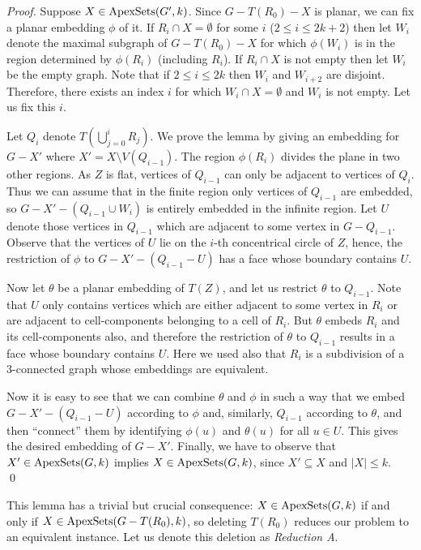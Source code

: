 \documentclass{llncs}
\begin{document}
\begin{proof}
Suppose $X \in \textup{ApexSets}(G',k)$.
Since $G-T(R_0)-X$ is planar, we can fix a planar embedding $\phi$ of it.
If $R_i \cap X = \emptyset$ for some $i$ ($2 \leq i \leq 2k+2$)
then let $W_i$ denote the maximal subgraph of $G-T(R_0)-X$ for
which $\phi(W_i)$ is in the region determined by $\phi(R_i)$ (including $R_i$).
If $R_i \cap X$ is not empty then let $W_i$ be the empty graph.
Note that if $2 \leq i \leq 2k$ then $W_i$ and $W_{i+2}$ are disjoint.
Therefore, there exists an index $i$ for which $W_i \cap X = \emptyset$
and $W_i$ is not empty.
Let us fix this $i$.

Let $Q_i$ denote $T(\bigcup_{j=0}^i R_j)$.
We prove the lemma by giving an embedding for $G-X'$ where
$X'=X \setminus V(Q_{i-1})$.
The region $\phi(R_i)$ divides the plane in two other regions.
As $Z$ is flat, vertices of $Q_{i-1}$ can only be adjacent to vertices of $Q_i$.
Thus we can assume that in the finite region only vertices of $Q_{i-1}$ are embedded, so
$G-X'-(Q_{i-1} \cup W_i)$ is entirely embedded in the infinite region.
Let $U$ denote those vertices in $Q_{i-1}$ which are adjacent
to some vertex in $G-Q_{i-1}$.
Observe that the vertices of $U$ lie on the $i$-th concentrical circle of $Z$, hence,
the restriction of $\phi$ to $G-X'-(Q_{i-1}-U)$ has a face whose boundary contains $U$.


Now let $\theta$ be a planar embedding of $T(Z)$, and let us restrict $\theta$ to $Q_{i-1}$.
Note that $U$ only contains vertices which are either
adjacent to some vertex in $R_i$ or are adjacent to cell-components
belonging to a cell of $R_i$.
But $\theta$ embeds $R_i$ and its cell-components also, and therefore the restriction of
$\theta$ to $Q_{i-1}$ results in a face whose boundary contains $U$. Here we used also
that $R_i$ is a subdivision of a 3-connected graph whose embeddings are equivalent.

Now it is easy to see that we can combine $\theta$ and $\phi$ in such a way
that we embed $G-X'-(Q_{i-1}-U)$ according to $\phi$
and, similarly, $Q_{i-1}$ according to $\theta$, and then ``connect'' them by identifying
$\phi(u)$ and $\theta(u)$ for all $u \in U$. This gives the desired embedding of
$G-X'$. Finally, we have to observe that
$X' \in \textup{ApexSets}(G,k)$ implies
$X \in \textup{ApexSets}(G,k)$, since $X' \subseteq X$ and $|X| \leq k$.
\qed
\end{proof}

This lemma has a trivial but crucial consequence:
$X \in \textup{ApexSets}(G,k)$ if and only if
$X \in \textup{ApexSets}(G-T(R_0),k)$,
so deleting $T(R_0)$ reduces our problem to an equivalent instance.
Let us denote this deletion as \emph{Reduction A}.
\end{document}
